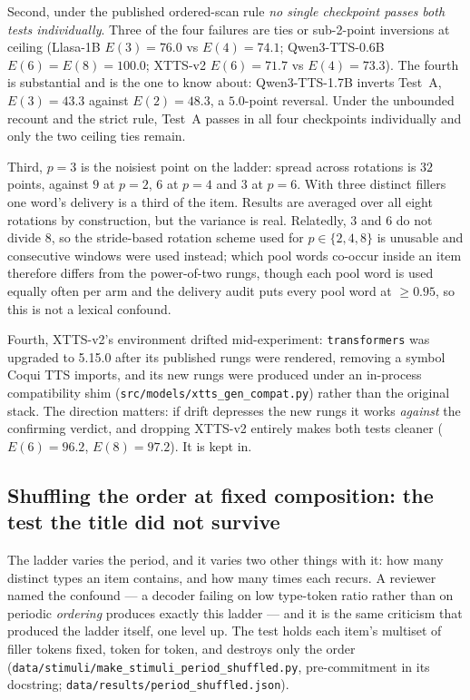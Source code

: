 \documentclass[11pt]{article}
\begin{document}
Second, under the published ordered-scan rule \emph{no single checkpoint passes
both tests individually}. Three of the four failures are ties or sub-2-point
inversions at ceiling (Llasa-1B $E(3){=}76.0$ vs $E(4){=}74.1$; Qwen3-TTS-0.6B
$E(6){=}E(8){=}100.0$; XTTS-v2 $E(6){=}71.7$ vs $E(4){=}73.3$). The fourth is
substantial and is the one to know about: Qwen3-TTS-1.7B inverts Test~A,
$E(3){=}43.3$ against $E(2){=}48.3$, a $5.0$-point reversal. Under the unbounded
recount and the strict rule, Test~A passes in all four checkpoints individually
and only the two ceiling ties remain.

Third, $p{=}3$ is the noisiest point on the ladder: spread across rotations is
$32$ points, against $9$ at $p{=}2$, $6$ at $p{=}4$ and $3$ at $p{=}6$. With
three distinct fillers one word's delivery is a third of the item. Results are
averaged over all eight rotations by construction, but the variance is real.
Relatedly, $3$ and $6$ do not divide $8$, so the stride-based rotation scheme
used for $p \in \{2,4,8\}$ is unusable and consecutive windows were used
instead; which pool words co-occur inside an item therefore differs from the
power-of-two rungs, though each pool word is used equally often per arm and the
delivery audit puts every pool word at $\ge 0.95$, so this is not a lexical
confound.

Fourth, XTTS-v2's environment drifted mid-experiment: \texttt{transformers} was
upgraded to 5.15.0 after its published rungs were rendered, removing a symbol
Coqui TTS imports, and its new rungs were produced under an in-process
compatibility shim (\texttt{src/models/xtts\_gen\_compat.py}) rather than the
original stack. The direction matters: if drift depresses the new rungs it works
\emph{against} the confirming verdict, and dropping XTTS-v2 entirely makes both
tests cleaner ($E(6){=}96.2$, $E(8){=}97.2$). It is kept in.

\subsection{Shuffling the order at fixed composition: the test the title did
not survive}

The ladder varies the period, and it varies two other things with it: how many
distinct types an item contains, and how many times each recurs. A reviewer
named the confound --- a decoder failing on low type-token ratio rather than on
periodic \emph{ordering} produces exactly this ladder --- and it is the same
criticism that produced the ladder itself, one level up. The test holds each
item's multiset of filler tokens fixed, token for token, and destroys only the
order (\texttt{data/stimuli/make\_stimuli\_period\_shuffled.py}, pre-commitment
in its docstring; \texttt{data/results/period\_shuffled.json}).
\end{document}

